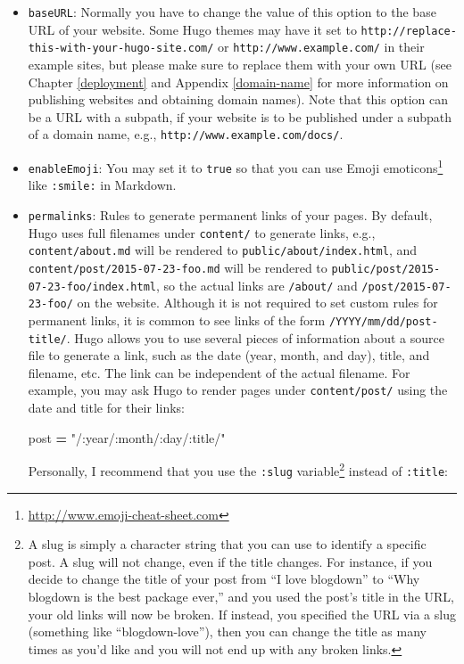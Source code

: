 \documentclass[12pt,]{krantz}
\makeatletter
\newenvironment{Shaded}{\begin{snugshade}}{\end{snugshade}}
\newcommand{\NormalTok}[1]{#1}
\newcommand{\OperatorTok}[1]{\textcolor[rgb]{0.81,0.36,0.00}{\textbf{#1}}}
\newcommand{\StringTok}[1]{\textcolor[rgb]{0.31,0.60,0.02}{#1}}
\renewcommand{\href}[2]{#2\footnote{\url{#1}}}
\newenvironment{kframe}{%
\medskip{}
\setlength{\fboxsep}{.8em}
 \def\at@end@of@kframe{}%
 \ifinner\ifhmode%
  \def\at@end@of@kframe{\end{minipage}}%
  \begin{minipage}{\columnwidth}%
 \fi\fi%
 \def\FrameCommand##1{\hskip\@totalleftmargin \hskip-\fboxsep
 \colorbox{shadecolor}{##1}\hskip-\fboxsep
     \hskip-\linewidth \hskip-\@totalleftmargin \hskip\columnwidth}%
 \MakeFramed {\advance\hsize-\width
   \@totalleftmargin\z@ \linewidth\hsize
   \@setminipage}}%
 {\par\unskip\endMakeFramed%
 \at@end@of@kframe}
\renewenvironment{Shaded}{\begin{kframe}}{\end{kframe}}
\theoremstyle{definition}
\theoremstyle{definition}
\theoremstyle{definition}
\theoremstyle{remark}
\makeatother
\begin{document}
\begin{itemize}
\item
  \texttt{baseURL}: Normally you have to change the value of this option
  to the base URL of your website. Some Hugo themes may
  have it set to \texttt{http://replace-this-with-your-hugo-site.com/}
  or \texttt{http://www.example.com/} in their example sites, but please
  make sure to replace them with your own URL (see Chapter
  \ref{deployment} and Appendix \ref{domain-name} for more information
  on publishing websites and obtaining domain names). Note that this
  option can be a URL with a subpath, if your website is to be published
  under a subpath of a domain name, e.g.,
  \texttt{http://www.example.com/docs/}.
\item
  \texttt{enableEmoji}: You may set it to \texttt{true} so
  that you can use \href{http://www.emoji-cheat-sheet.com}{Emoji
  emoticons} like \texttt{:smile:} in Markdown.
\item
  \texttt{permalinks}: Rules to generate permanent
  links of your pages. By default, Hugo uses full
  filenames under \texttt{content/} to generate links, e.g.,
  \texttt{content/about.md} will be rendered to
  \texttt{public/about/index.html}, and
  \texttt{content/post/2015-07-23-foo.md} will be rendered to
  \texttt{public/post/2015-07-23-foo/index.html}, so the actual links
  are \texttt{/about/} and \texttt{/post/2015-07-23-foo/} on the
  website. Although it is not required to set custom rules for permanent
  links, it is common to see links of the form
  \texttt{/YYYY/mm/dd/post-title/}. Hugo allows you to use several
  pieces of information about a source file to generate a link, such as
  the date (year, month, and day), title, and filename, etc. The link
  can be independent of the actual filename. For example, you may ask
  Hugo to render pages under \texttt{content/post/} using the date and
  title for their links:

\begin{Shaded}
\begin{Highlighting}[]
\NormalTok{[permalinks]}
\NormalTok{    post }\OperatorTok{=} \StringTok{"/:year/:month/:day/:title/"}
\end{Highlighting}
\end{Shaded}

  Personally, I recommend that you use the \texttt{:slug}
  variable\footnote{A slug is simply a character string that you can use
    to identify a specific post. A slug will not change, even if the
    title changes. For instance, if you decide to change the title of
    your post from ``I love blogdown'' to ``Why blogdown is the best
    package ever,'' and you used the post's title in the URL, your old
    links will now be broken. If instead, you specified the URL via a
    slug (something like ``blogdown-love''), then you can change the
    title as many times as you'd like and you will not end up with any
    broken links.} instead of \texttt{:title}:


\end{itemize}
\end{document}
